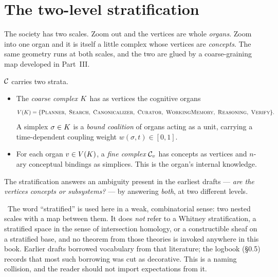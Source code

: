 \section{The two-level stratification}\label{sec:strat}

\begin{intu}\Intu
The society has two scales. Zoom out and the vertices are whole
\emph{organs}. Zoom into one organ and it is itself a little complex whose
vertices are \emph{concepts}. The same geometry runs at both scales, and
the two are glued by a coarse-graining map developed in Part~III.
\end{intu}

\begin{construction}\label{con:strat}
$\mathcal{C}$ carries two strata.
\begin{itemize}
  \item The \emph{coarse complex} $K$ has as vertices the cognitive
        organs
        \[
          V(\Kc)=\{\textsc{Planner},\ \textsc{Search},\
          \textsc{Canonicalizer},\ \textsc{Curator},\
          \textsc{WorkingMemory},\ \textsc{Reasoning},\ \textsc{Verify}\}.
        \]
        A simplex $\sigma\in K$ is a \emph{bound coalition} of organs
        acting as a unit, carrying a time-dependent coupling weight
        $w(\sigma,t)\in[0,1]$.
  \item For each organ $v\in V(K)$, a \emph{fine complex} $\mathcal{C}_v$ has
        concepts as vertices and $n$-ary conceptual bindings as
        simplices. This is the organ's internal knowledge.
\end{itemize}
\end{construction}

The stratification answers an ambiguity present in the earliest drafts
--- \emph{are the vertices concepts or subsystems?} --- by answering
\emph{both}, at two different levels.

\begin{hon}\Hon
\Contested\ The word ``stratified'' is used here in a weak,
combinatorial sense: two nested scales with a map between them. It does
\emph{not} refer to a Whitney stratification, a stratified space in the
sense of intersection homology, or a constructible sheaf on a stratified
base, and no theorem from those theories is invoked anywhere in this
book. Earlier drafts borrowed vocabulary from that literature; the
logbook (\S0.5) records that most such borrowing was cut as decorative.
This is a naming collision, and the reader should not import
expectations from it.
\end{hon}

